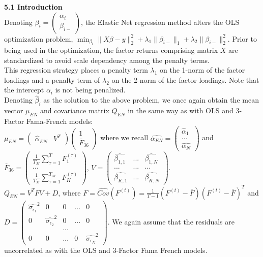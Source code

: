 \documentclass{article}
\begin{document}
\textbf{5.1 Introduction}\\

Denoting $\beta_i = \begin{pmatrix} \alpha_i\\
\beta_{i-} \end{pmatrix}$, the Elastic Net regression method alters the OLS optimization problem, $\min_{\beta_i} \|X\beta - y\|_2^2 + \lambda_1 \| \beta_{i-} \|_1 + \lambda_2 \| \beta_{i-} \|_2^2$. Prior to being used in the optimization, the factor returns comprising matrix $X$ are standardized to avoid scale dependency among the penalty terms.\\

This regression strategy places a penalty term $\lambda_1$ on the 1-norm of the factor loadings and a penalty term of $\lambda_2$ on the 2-norm of the factor loadings. Note that the intercept $\alpha_i$ is not being penalized.\\

Denoting $\hat{\beta}_i$ as the solution to the above problem, we once again obtain the mean vector $\mu_{EN}$ and covariance matrix $Q_{EN}$ in the same way as with OLS and 3-Factor Fama-French models:\\

$\mu_{EN} = \begin{pmatrix} \hat{\alpha}_{EN} & V^T \end{pmatrix} \begin{pmatrix} 1\\
\bar{F}_{36} \end{pmatrix}$ where we recall $\hat{\alpha_{EN}} = \begin{pmatrix} \hat{\alpha}_1 \\
...\\
\hat{\alpha_N} \end{pmatrix}$ and $\bar{F}_{36} = \begin{pmatrix} \frac{1}{T_M} \sum_{\tau=1}^{T} F_1^{(\tau)}\\
...\\
\frac{1}{T_M} \sum_{\tau=1}^{T_M} F_K^{(\tau)} \end{pmatrix}$, $V = \begin{pmatrix} \hat{\beta_{1,1}} & ... & \hat{\beta_{1,N}}\\
... & ... & ...\\
\hat{\beta_{K,1}} & ... & \hat{\beta_{K,N}} \end{pmatrix}$.\\

$Q_{EN} = V^TFV + D$, where $F = \hat{Cov}(F^{(t)}) = \frac{1}{T-1}(F^{(t)} - \bar{F})(F^{(t)} - \bar{F})^{T}$ and $D = \begin{pmatrix} \hat{\sigma_{\epsilon_1}}^2 & 0 & 0 & ... & 0\\
0 & \hat{\sigma_{\epsilon_2}}^2 & 0 & ... & 0\\
 & & ... & &\\
0 & 0 & ... & 0 & \hat{\sigma_{\epsilon_N}}^2 \end{pmatrix}$. We again assume that the residuals are uncorrelated as with the OLS and 3-Factor Fama French models.\\
\end{document}

